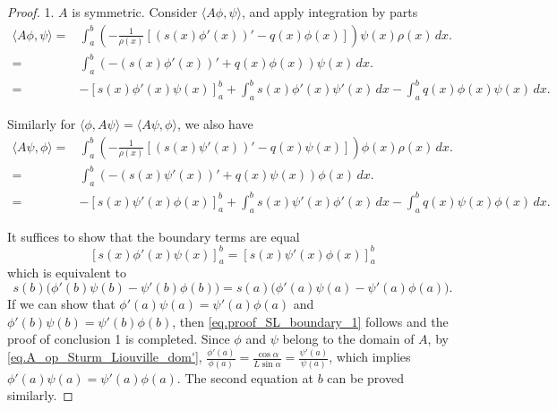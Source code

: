 \begin{proof}
    1. $A$ is symmetric. Consider $\langle A\phi, \psi \rangle$, and apply integration by parts
    \begin{equation}\label{eq.proof_SL_integral_parts}
    \begin{split}
        \langle A\phi, \psi \rangle =& \int_a^b \left(-\frac{1}{\rho(x)}[(s(x)\phi'(x))' - q(x)\phi(x)]\right) \psi(x) \rho(x) \, dx. 
        \\
        =& \int_a^b \left( -(s(x)\phi'(x))' + q(x)\phi(x) \right)\psi(x) \, dx. 
        \\
        =&-[s(x)\phi'(x)\psi(x)]_a^b + \int_a^b s(x)\phi'(x)\psi'(x) \, dx - \int_a^b q(x)\phi(x)\psi(x) \, dx.
    \end{split} 
    \end{equation}

    Similarly for $\langle \phi, A\psi\rangle = \langle A\psi, \phi\rangle$, we also have
    \begin{equation}\label{eq.proof_SL_integral_parts'}
    \begin{split}
        \langle A\psi, \phi\rangle =& \int_a^b \left(-\frac{1}{\rho(x)}[(s(x)\psi'(x))' - q(x)\psi(x)]\right) \phi(x) \rho(x) \, dx. 
        \\
        =& \int_a^b \left( -(s(x)\psi'(x))' + q(x)\psi(x) \right)\phi(x) \, dx. 
        \\
        =&-[s(x)\psi'(x)\phi(x)]_a^b + \int_a^b s(x)\psi'(x)\phi'(x) \, dx - \int_a^b q(x)\psi(x)\phi(x) \, dx.
    \end{split} 
    \end{equation}
    
    It suffices to show that the boundary terms are equal
    \begin{equation}\label{eq.proof_SL_boundary}
        [s(x)\phi'(x)\psi(x)]_a^b = [s(x)\psi'(x)\phi(x)]_a^b
    \end{equation}
    which is equivalent to 
    \begin{equation}\label{eq.proof_SL_boundary_1}
        s(b) \Big(\phi'(b) \psi(b) - \psi'(b) \phi(b)\Big) = s(a) \Big(\phi'(a) \psi(a) - \psi'(a) \phi(a)\Big).
    \end{equation}
    If we can show that $\phi'(a) \psi(a) = \psi'(a) \phi(a)$ and $\phi'(b) \psi(b) = \psi'(b) \phi(b)$, then \eqref{eq.proof_SL_boundary_1} follows and the proof of conclusion 1 is completed. Since $\phi$ and $\psi$ belong to the domain of $A$, by \eqref{eq.A_op_Sturm_Liouville_dom'}, $\frac{\phi'(a)}{\phi(a)} = \frac{\cos \alpha}{L\sin \alpha} = \frac{\psi'(a)}{\psi(a)}$, which implies $\phi'(a) \psi(a) = \psi'(a) \phi(a)$. The second equation at $b$ can be proved similarly.
    

\end{proof}
